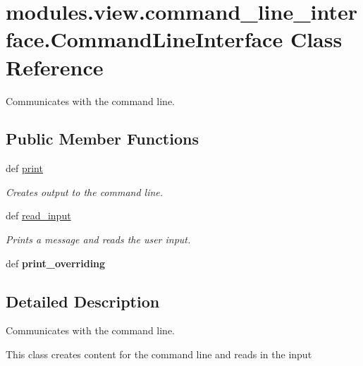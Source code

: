 \hypertarget{classmodules_1_1view_1_1command__line__interface_1_1_command_line_interface}{}\section{modules.\+view.\+command\+\_\+line\+\_\+interface.\+Command\+Line\+Interface Class Reference}
\label{classmodules_1_1view_1_1command__line__interface_1_1_command_line_interface}


Communicates with the command line.  


\subsection*{Public Member Functions}
\begin{DoxyCompactItemize}
\item 
def \mbox{\hyperlink{classmodules_1_1view_1_1command__line__interface_1_1_command_line_interface_a595c438fc364cdf5670981ce5ea5b4d4}{print}}
\begin{DoxyCompactList}\small\item\em Creates output to the command line. \end{DoxyCompactList}\item 
def \mbox{\hyperlink{classmodules_1_1view_1_1command__line__interface_1_1_command_line_interface_a41d93944a496632332dbf74a9ff1c10c}{read\+\_\+input}}
\begin{DoxyCompactList}\small\item\em Prints a message and reads the user input. \end{DoxyCompactList}\item 
\mbox{\label{classmodules_1_1view_1_1command__line__interface_1_1_command_line_interface_affa2836967316e7bbd5bfdd1f0b1d60f}} 
def {\bfseries print\+\_\+overriding}
\end{DoxyCompactItemize}


\subsection{Detailed Description}
Communicates with the command line. 

This class creates content for the command line and reads in the input 

